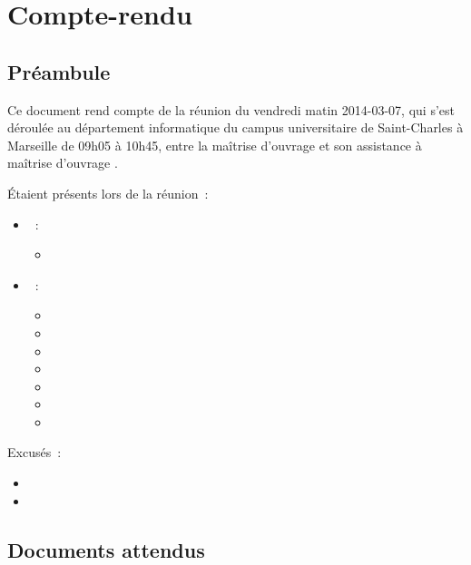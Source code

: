 \documentclass[11pt,fleqn]{report}
\begin{document}
\ZMakeCover


\chapter*{Compte-rendu}
\setcounter{chapter}{1}

\section{Préambule}
Ce document rend compte de la réunion du vendredi matin 2014-03-07, qui s'est déroulée au département informatique du campus universitaire de Saint-Charles à Marseille de 09h05 à 10h45, entre la maîtrise d'ouvrage \mo et son assistance à maîtrise d'ouvrage \amo.

Étaient présents lors de la réunion~:
\begin{itemize}
	\item \mo~:
	\begin{itemize}
		\item \Agopian
	\end{itemize}
	\item \amo~:
	\begin{itemize}
		\item \Cadon
		\item \Gairoard
		\item \Julien
		\item \Mezelle
		\item \Pachy
		\item \SuangaWeto
		\item \Toure
	\end{itemize}
\end{itemize}
Excusés~:
\begin{itemize}
	\item \Balde
	\item \Lericolais
\end{itemize}

\section{Documents attendus}
\end{document}
